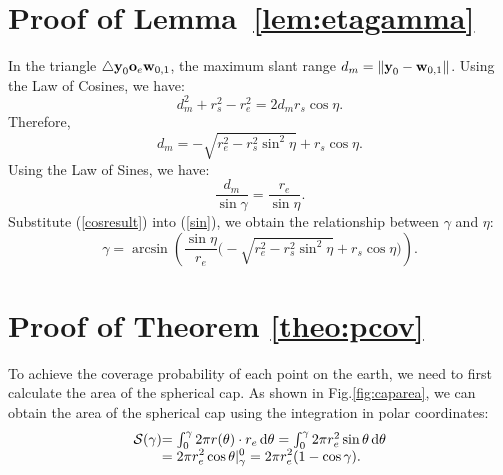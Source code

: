 \documentclass[final]{IEEEtran}
\begin{document}
\section{Proof of Lemma~\ref{lem:etagamma}}\label{app:etagamma}
\indent In the triangle $\triangle \textbf{y}_0\textbf{o}_e\textbf{w}_{0,1}$, the maximum slant range $d_m=\|\textbf{y}_0-\textbf{w}_{0,1}\|$. Using the Law of Cosines, we have:
\begin{equation}
    d_m^2+r_s^2-r_e^2=2d_mr_s\cos\eta.
\end{equation}
Therefore, 
\begin{equation}
    d_m=-\sqrt{r_e^2-r_s^2\sin^2\eta}+r_s\cos\eta.
    \label{cosresult}
\end{equation}
Using the Law of Sines, we have:
\begin{equation}
    \frac{d_m}{\sin\gamma}=\frac{r_e}{\sin\eta}.
    \label{sin}
\end{equation}
Substitute (\ref{cosresult}) into (\ref{sin}), we obtain the relationship between $\gamma$ and $\eta$:
   \begin{equation}
       \gamma=\arcsin(\frac{\sin\eta}{r_e}\bigg(-\sqrt{r_e^2-r_s^2\sin^2\eta}+r_s \cos\eta\bigg)).
   \end{equation}

\section{Proof of Theorem \ref{theo:pcov}}\label{app:pcov}
To achieve the coverage probability of each point on the earth, we need to first calculate the area of the spherical cap. As shown in Fig.\ref{fig:caparea},  we can obtain the area of the spherical cap using the integration in polar coordinates:
\begin{equation}
\begin{array}{r@{}l}
    
\mathcal{S}(\gamma)&=\int_{0}^{\gamma}2\pi r(\theta)\cdot r_e\,\dd \theta=\int_{0}^{\gamma}2\pi r_e^2\sin\theta\,\dd \theta\\
&=\displaystyle2\pi r_e^2\cos\theta|_{\gamma}^{0}=\displaystyle2\pi r_e^2(1-\cos\gamma).
\end{array}
\end{equation}
\end{document}
